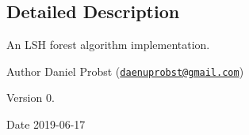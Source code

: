 \subsection{Detailed Description}
An L\+SH forest algorithm implementation. 

\begin{DoxyAuthor}{Author}
Daniel Probst (\href{mailto:daenuprobst@gmail.com}{\tt daenuprobst@gmail.\+com}) 
\end{DoxyAuthor}
\begin{DoxyVersion}{Version}
0. 
\end{DoxyVersion}
\begin{DoxyDate}{Date}
2019-\/06-\/17 
\end{DoxyDate}

